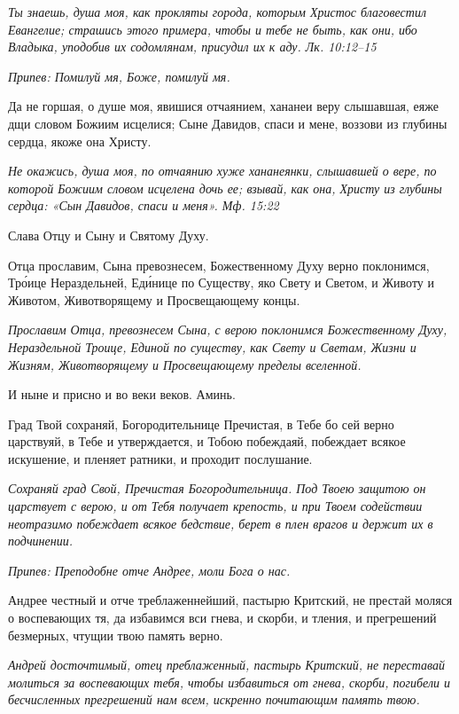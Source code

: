 \itshape Ты знаешь, душа моя, как прокляты города, которым Христос благовестил Евангелие; страшись этого примера, чтобы и тебе не быть, как они, ибо Владыка, уподобив их содомлянам, присудил их к аду. Лк. 10:12–15\normalfont{}


\itshape Припев:\normalfont{} Помилуй мя, Боже, помилуй мя.


Да не горшая, о душе моя, явишися отчаянием, хананеи веру слышавшая, еяже дщи словом Божиим исцелися; Сыне Давидов, спаси и мене, воззови из глубины сердца, якоже она Христу.


\itshape Не окажись, душа моя, по отчаянию хуже хананеянки, слышавшей о вере, по которой Божиим словом исцелена дочь ее; взывай, как она, Христу из глубины сердца: «Сын Давидов, спаси и меня». Мф. 15:22\normalfont{}


Слава Отцу и Сыну и Святому Духу.


Отца прославим, Сына превознесем, Божественному Духу верно поклонимся, Тро́ице Нераздельней, Еди́нице по Существу, яко Свету и Светом, и Животу и Животом, Животворящему и Просвещающему концы.


\itshape Прославим Отца, превознесем Сына, с верою поклонимся Божественному Духу, Нераздельной Троице, Единой по существу, как Свету и Светам, Жизни и Жизням, Животворящему и Просвещающему пределы вселенной.\normalfont{}


И ныне и присно и во веки веков. Аминь.


Град Твой сохраняй, Богородительнице Пречистая, в Тебе бо сей верно царствуяй, в Тебе и утверждается, и Тобою побеждаяй, побеждает всякое искушение, и пленяет ратники, и проходит послушание.


\itshape Сохраняй град Свой, Пречистая Богородительница. Под Твоею защитою он царствует с верою, и от Тебя получает крепость, и при Твоем содействии неотразимо побеждает всякое бедствие, берет в плен врагов и держит их в подчинении.\normalfont{}


\itshape Припев:\normalfont{} Преподобне отче Андрее, моли Бога о нас.


Андрее честный и отче треблаженнейший, пастырю Критский, не престай моляся о воспевающих тя, да избавимся вси гнева, и скорби, и тления, и прегрешений безмерных, чтущии твою память верно.


\itshape Андрей досточтимый, отец преблаженный, пастырь Критский, не переставай молиться за воспевающих тебя, чтобы избавиться от гнева, скорби, погибели и бесчисленных прегрешений нам всем, искренно почитающим память твою.\normalfont{}


